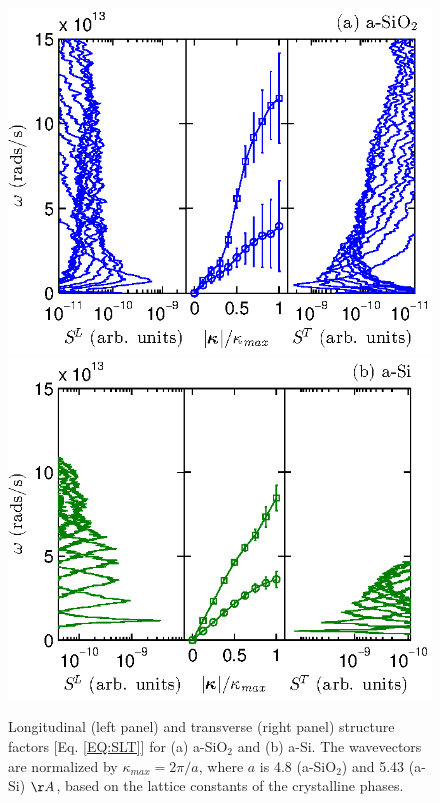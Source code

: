 \documentclass[aps,prb,onecolumn,preprint,superscriptaddress,footinbib,amsmath,amssymb,floatfix]{revtex4}
\begin{document}
\begin{figure}
\begin{center}
\includegraphics[scale=1.0]
{fig3b.eps}
\includegraphics[scale=1.0]
{fig3a.eps}
\end{center}
\caption{\label{FIG:disp} Longitudinal (left panel) and transverse 
(right panel) structure factors [Eq. \eqref{EQ:SLT}] for (a) a-SiO$_2$ 
and (b) a-Si. 
The wavevectors are normalized by $\kappa_{max} = 2\pi/a$, where $a$ 
is 4.8 (a-SiO$_2$) and 5.43 (a-Si) $\AA$, based 
on the lattice constants of the crystalline phases.
\cite{wyckoff_crystal_1963,stillinger_computer_1985} }
\end{figure}
\vspace{130mm}
\end{document}
